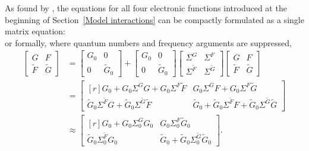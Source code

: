 As found by  \cite{Nambu60}, the  equations for all four
electronic  functions introduced at the beginning of
Section~\ref{Model interactions} can be compactly formulated as a single matrix
equation:
%
\begin{equation*}
    
\end{equation*}
%
or formally, where quantum numbers and frequency arguments are suppressed,
%
\begin{equation} \label{Nambu-Dyson equation}
    \begin{split}
        \begin{bmatrix}
            G & F \\
            \widetilde F & \widetilde G
        \end{bmatrix}
        &=
        \begin{bmatrix}
            G_0 & 0 \\
            0 & \widetilde G_0
        \end{bmatrix}
        +
        \begin{bmatrix}
            G_0 & 0 \\
            0 & \widetilde G_0
        \end{bmatrix}
        \begin{bmatrix}
            \Sigma^G & \Sigma^F \\
            \Sigma^{\widetilde F} & \Sigma^{\widetilde G}
        \end{bmatrix}
        \begin{bmatrix}
            G & F \\
            \widetilde F & \widetilde G
        \end{bmatrix}
        \\
        &=
        \begin{bmatrix*}[r]
            G_0 + G_0 \Sigma^G G + G_0 \Sigma^F \widetilde F
            & G_0 \Sigma^G F + G_0 \Sigma^F \widetilde G \\
            \widetilde G_0 \Sigma^{\widetilde F} G
            + \widetilde G_0 \Sigma^{\widetilde G} \widetilde F
            & \widetilde G_0 + \widetilde G_0 \Sigma^{\widetilde F} F
            + \widetilde G_0 \Sigma^{\widetilde G} \widetilde G
        \end{bmatrix*}
        \\
        &\approx
        \begin{bmatrix*}[r]
            G_0 + G_0 \Sigma^G_0 G_0 & G_0 \Sigma^F_0 \widetilde G_0 \\
            \widetilde G_0 \Sigma^{\widetilde F}_0 G_0 & \widetilde G_0
            + \widetilde G_0 \Sigma^{\widetilde G}_0 \widetilde G_0
        \end{bmatrix*}.
    \end{split}
\end{equation}

